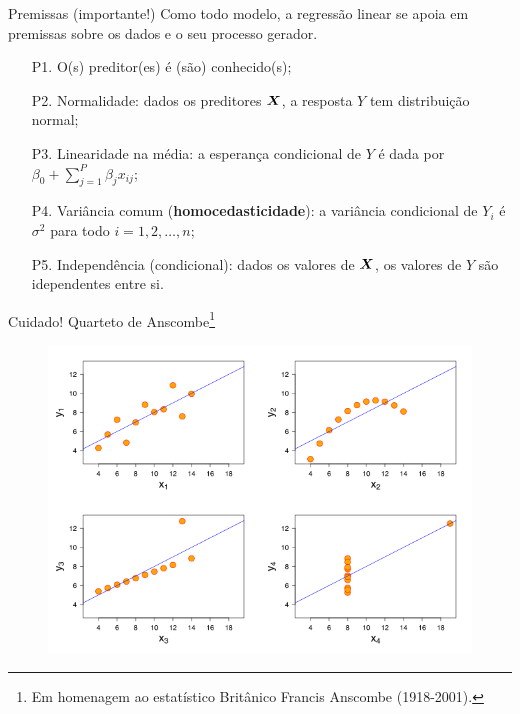 \begin{frame}{Premissas (importante!)}
Como todo modelo, a regressão linear se apoia em premissas sobre os dados e o seu processo gerador.
\begin{itemize}
 \item[P1.] O(s) preditor(es) é (são) conhecido(s);
 \item[P2.] Normalidade: dados os preditores $\boldsymbol{X}$, a resposta $Y$ tem distribuição normal;
 \item[P3.] Linearidade na média: a esperança condicional de $Y$ é dada por $\beta_0 + \sum_{j=1}^P \beta_jx_{ij}$;
 \item[P4.] Variância comum (\textbf{homocedasticidade}): a variância condicional de $Y_i$ é  $\sigma^2$ para todo $i = 1, 2, \ldots, n$;
 \item[P5.] Independência (condicional): dados os valores de $\boldsymbol{X}$, os valores de $Y$ são idependentes entre si.
\end{itemize}
\end{frame}

\begin{frame}{Cuidado! Quarteto de Anscombe\footnote{Em homenagem ao estatístico Britânico Francis Anscombe (1918-2001).}}
  \begin{figure}
  \begin{center}
   \includegraphics[scale=.435]{figures/anscombe.png}
  \end{center}
  \label{fig:anscombe_quartet}
 \end{figure}
\end{frame}

